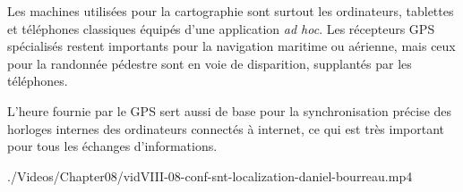 \begin{tcolorbox}[title={Machines}, toprule=0pt, leftrule=0pt, rightrule=0pt, arc=0pt,
                  fonttitle=\scshape\boxtitlefont,
                  colbacktitle=white, coltitle=firstcolor, colframe=firstcolor, colback=firstcolor!10,
                  breakable, enhanced jigsaw]
Les machines utilisées pour la cartographie sont surtout les ordinateurs, tablettes et téléphones classiques équipés d’une application \textit{ad hoc}. Les récepteurs GPS spécialisés restent importants pour la navigation maritime ou aérienne, mais ceux pour la randonnée pédestre sont en voie de disparition, supplantés par les téléphones.

L’heure fournie par le GPS sert aussi de base pour la synchronisation précise des horloges internes des ordinateurs connectés à internet, ce qui est très important pour tous les échanges d’informations.
\end{tcolorbox}


\begin{marginvideo}
		{./Videos/Chapter08/vidVIII-08-conf-snt-localization-daniel-bourreau.mp4}%
\end{marginvideo}

